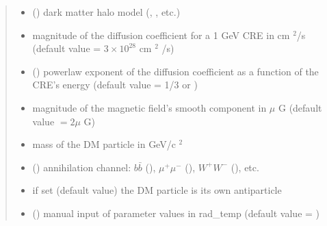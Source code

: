 \documentclass[letterpaper,10pt,english]{sphinxmanual}
\begin{document}
\begin{fulllineitems}
\begin{quote}
\begin{description}
\begin{itemize}
\item {} 
\sphinxAtStartPar
{} () \textendash{} dark matter halo model (, , etc.)

\item {} 
\sphinxAtStartPar
{} \textendash{} magnitude of the diffusion coefficient for a 1 GeV CRE in cm \({}^2\)/s (default value = \(3\times 10^{28}\) cm \({}^2\) /s)

\item {} 
\sphinxAtStartPar
{} (\sphinxstyleliteralemphasis{\sphinxupquote{, }}) \textendash{} power\sphinxhyphen{}law exponent of the diffusion coefficient as a function of the CRE’s energy (default value = 1/3 or )

\item {} 
\sphinxAtStartPar
{} \textendash{} magnitude of the magnetic field’s smooth component in \(\mu\) G (default value \(= 2 \mu\) G)

\item {} 
\sphinxAtStartPar
{} \textendash{} mass of the DM particle in GeV/c \({}^2\)

\item {} 
\sphinxAtStartPar
{} () \textendash{} annihilation channel: \(b\bar b\) (), \(\mu^+ \mu^-\) (), \(W^+ W^-\) (), etc.

\item {} 
\sphinxAtStartPar
{} \textendash{} if set  (default value) the DM particle is its own antiparticle

\item {} 
\sphinxAtStartPar
{} () \textendash{} manual input of parameter values in rad\_temp (default value = )


\end{itemize}
\end{description}
\end{quote}
\end{fulllineitems}
\end{document}
